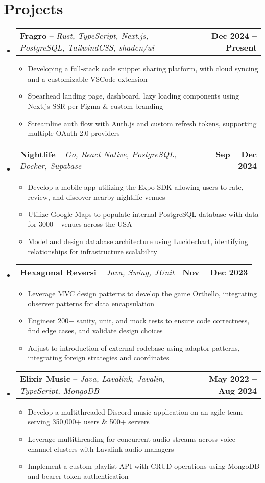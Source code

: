 \documentclass[letterpaper,11pt]{article}
\makeatletter
\newcommand{\resumeItem}[1]{
  \item\small{
    {#1 \vspace{-2pt}}
  }
}
\newcommand{\resumeProjectHeading}[2]{
    \item
    \begin{tabular*}{1.001\textwidth}{l@{\extracolsep{\fill}}r}
      \small#1 & \textbf{\small #2}\\
    \end{tabular*}\vspace{-7pt}
}
\newcommand{\resumeSubHeadingListStart}{\begin{itemize}[leftmargin=0.0in, label={}]}
\newcommand{\resumeSubHeadingListEnd}{\end{itemize}}
\newcommand{\resumeItemListStart}{\begin{itemize}}
\newcommand{\resumeItemListEnd}{\end{itemize}\vspace{-5pt}}
\makeatother
\begin{document}
\section{Projects}
    \vspace{-15pt}
    \resumeSubHeadingListStart
        \resumeProjectHeading
            {\textbf{Fragro} – \emph{Rust, TypeScript, Next.js, PostgreSQL, TailwindCSS, shadcn/ui}}{Dec 2024 – Present}
            \resumeItemListStart
                \resumeItem{Developing a full-stack code snippet sharing platform, with cloud syncing and a customizable VSCode extension}
                \resumeItem{Spearhead landing page, dashboard, lazy loading components using Next.js SSR per Figma \& custom branding }
                \resumeItem{Streamline auth flow with Auth.js and custom refresh tokens, supporting multiple OAuth 2.0 providers}
            \resumeItemListEnd
            \vspace{-15pt}
        \resumeProjectHeading
            {\textbf{Nightlife} – \emph{Go, React Native, PostgreSQL, Docker, Supabase}}{Sep – Dec 2024}
            \resumeItemListStart
                \resumeItem{Develop a mobile app utilizing the Expo SDK allowing users to rate, review, and discover nearby nightlife venues}
                \resumeItem{Utilize Google Maps to populate internal PostgreSQL database with data for 3000+ venues across the USA}
                \resumeItem{Model and design database architecture using Lucidechart, identifying relationships for infrastructure scalability}
            \resumeItemListEnd
            \vspace{-15pt}
        \resumeProjectHeading
            {\textbf{Hexagonal Reversi} – \emph{Java, Swing, JUnit}}{Nov – Dec 2023}
            \resumeItemListStart
                \resumeItem{Leverage MVC design patterns to develop the game Orthello, integrating observer patterns for data encapsulation}
                \resumeItem{Engineer 200+ sanity, unit, and mock tests to ensure code correctness, find edge cases, and validate design choices}
                \resumeItem{Adjust to introduction of external codebase using adaptor patterns, integrating foreign strategies and coordinates}
            \resumeItemListEnd
            \vspace{-15pt}
        \resumeProjectHeading
            {\textbf{Elixir Music} – \emph{Java, Lavalink, Javalin, TypeScript, MongoDB}}{May 2022 – Aug 2024}
            \resumeItemListStart
                \resumeItem{Develop a multithreaded Discord music application on an agile team serving 350,000+ users \& 500+ servers}
                \resumeItem{Leverage multithreading for concurrent audio streams across voice channel clusters with Lavalink audio managers}
                \resumeItem{Implement a custom playlist API with CRUD operations using MongoDB and bearer token authentication}
            \resumeItemListEnd
            \vspace{-15pt}
    \resumeSubHeadingListEnd
    \vspace{0pt}
\end{document}

